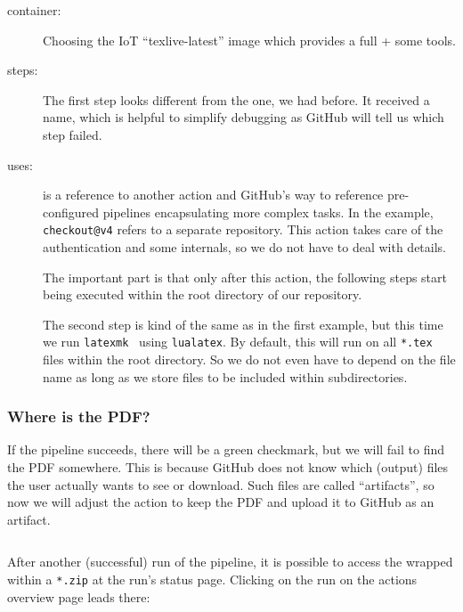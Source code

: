\documentclass[final]{ltugboat}
\newcommand*{\TeXLive}{\acro{\TeX\,Live}\xspace}
\newcommand*{\action}[1]{\texttt{#1}}
\newcommand*{\command}[1]{\texttt{#1}}
\newcommand*{\file}[1]{\texttt{#1}}
\newcommand*{\containerimage}[1]{\enquote{#1}}
\begin{document}
\begin{description}
\item[container:] Choosing the IoT \containerimage{texlive-latest} image which provides a full \TeXLive{} + some tools\cite{islandoftex-docker}.
\item[steps:]
The first step looks different from the one, we had before.
It received a name, which is helpful to simplify debugging as GitHub will tell us which step failed.

\item[uses:] is a reference to another action and GitHub's way to reference pre-configured pipelines encapsulating more complex tasks.
In the example, \action{checkout@v4} refers to a separate repository\cite{github-action-checkout}.
This action takes care of the authentication and some internals, so we do not have to deal with details.

The important part is that only after this action, the following steps start being executed within the root directory of our repository.

The second step is kind of the same as in the first example, but this time we run \command{latexmk}~\cite{latexmk} using \command{lualatex}.
By default, this will run on all \file{*.tex} files within the root directory.
So we do not even have to depend on the file name as long as we store files to be included within subdirectories.
\end{description}

\subsubsection{Where is the PDF?}
If the pipeline succeeds, there will be a green checkmark, but we will fail to find the PDF somewhere.
This is because GitHub does not know which (output) files the user actually wants to see or download.
Such files are called \enquote{artifacts}, so now we will adjust the action to keep the PDF and upload it to GitHub as an artifact.

\inputminted[firstline=13, lastline=17,gobble=5]{yaml}{examples/latex-basic.yml}

After another (successful) run of the pipeline, it is possible to access the  wrapped within a \file{*.zip} at the run's status page.
Clicking on the run on the actions overview page leads there:
\end{document}
